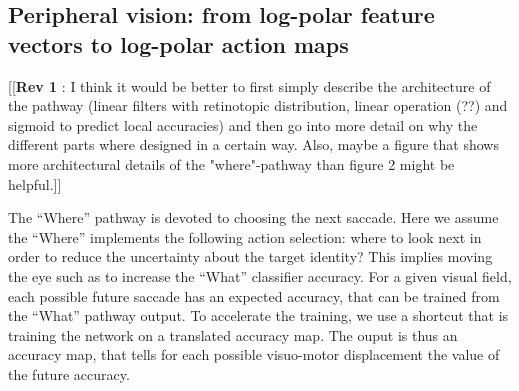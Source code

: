 \subsection*{Peripheral vision: from log-polar feature vectors to log-polar action maps}
%
%
%
{\color{magenta} [[\textbf{Rev 1} : I think it would be better to first simply describe the architecture of the pathway (linear filters with retinotopic distribution, linear operation (??) and sigmoid to predict local accuracies) and then go into more detail on why the different parts where designed in a certain way. Also, maybe a figure that shows more architectural details of the "where"-pathway than figure 2 might be helpful.]]}

The ``Where'' pathway is devoted to choosing the next saccade. 
Here we assume the ``Where'' implements the following action selection: where to look next in order to reduce the uncertainty about the target identity? This implies moving the eye such as to increase the ``What'' classifier accuracy. For a given visual field, each possible future saccade has an expected accuracy, that can be trained from the ``What'' pathway output. To accelerate the training, we use a shortcut that is training the network on a translated accuracy map. The ouput is thus an accuracy map, that tells for each possible visuo-motor displacement the value of the future accuracy.

